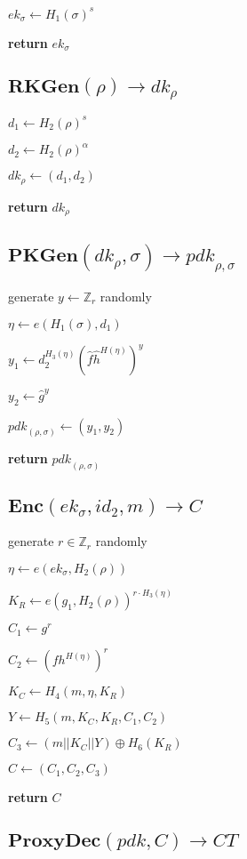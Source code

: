 \documentclass[a4paper]{article}
\begin{document}
$\textit{ek}_\sigma \gets H_1(\sigma)^s$

\textbf{return} $\textit{ek}_\sigma$

\subsection{$\textbf{RKGen}(\rho) \rightarrow \textit{dk}_\rho$}

$d_1 \gets H_2(\rho)^s$

$d_2 \gets H_2(\rho)^\alpha$

$\textit{dk}_\rho \gets (d_1, d_2)$

\textbf{return} $\textit{dk}_\rho$

\subsection{$\textbf{PKGen}(\textit{dk}_\rho, \sigma) \rightarrow \textit{pdk}_{\rho, \sigma}$}

generate $y \gets \mathbb{Z}_r$ randomly

$\eta \gets e(H_1(\sigma), d_1)$

$y_1 \gets d_2^{H_3(\eta)}(\hat{f}\hat{h}^{H(\eta)})^y$

$y_2 \gets \hat{g}^y$

$\textit{pdk}_{(\rho, \sigma)} \gets (y_1, y_2)$

\textbf{return} $\textit{pdk}_{(\rho, \sigma)}$

\subsection{$\textbf{Enc}(\textit{ek}_\sigma, \textit{id}_2, m) \rightarrow C$}

generate $r \in \mathbb{Z}_r$ randomly

$\eta \gets e(\textit{ek}_\sigma, H_2(\rho))$

$K_R \gets e(g_1, H_2(\rho))^{r \cdot H_3(\eta)}$

$C_1 \gets g^r$

$C_2 \gets (fh^{H(\eta)})^r$

$K_C \gets H_4(m, \eta, K_R)$

$Y \gets H_5(m, K_C, K_R, C_1, C_2)$

$C_3 \gets (m || K_C || Y) \oplus H_6(K_R)$

$C \gets (C_1, C_2, C_3)$

\textbf{return} $C$

\subsection{$\textbf{ProxyDec}(\textit{pdk}, C) \rightarrow \textit{CT}$}
\end{document}
